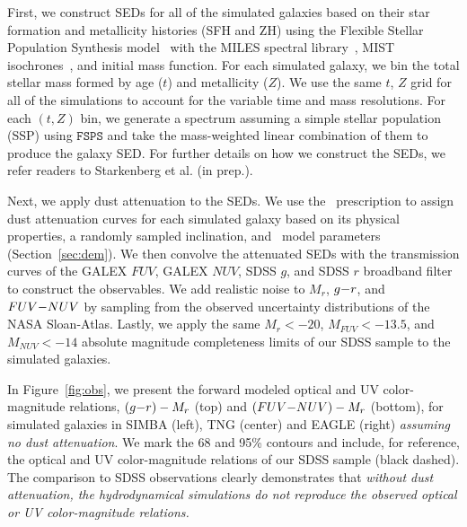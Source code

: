 First, we construct SEDs for all of the simulated galaxies based on their star
formation and metallicity histories (SFH and ZH) using the Flexible Stellar Population Synthesis
model~\citep[$\mathtt{FSPS}$;][]{conroy2009, conroy2010} with the MILES
spectral library~\citep{sanchez_blazquez2006}, MIST
isochrones~\citep{paxton2011, paxton2013, paxton2015, choi2016, dotter2016},
and \cite{chabrier2003} initial mass function.
For each simulated galaxy, we bin the total stellar mass formed by age ($t$) and metallicity
($Z$). We use the same $t$, $Z$ grid for all of the simulations
to account for the variable time and mass resolutions. 
For each $(t, Z)$ bin, we generate a spectrum assuming a simple stellar
population (SSP) using $\mathtt{FSPS}$ and take the mass-weighted linear
combination of them to produce the galaxy SED. 
For further details on how we construct the SEDs, we refer readers to
Starkenberg et al. (in prep.).

Next, we apply dust attenuation to the SEDs. We use the \eda~prescription
to assign dust attenuation curves for each simulated galaxy based on its physical
properties, a randomly sampled inclination, and \eda~model parameters
(Section~\ref{sec:dem}). 
We then convolve the attenuated SEDs with the transmission curves of the GALEX
$FUV$, GALEX $NUV$, SDSS $g$, and SDSS $r$ broadband filter to construct the
observables. 
We add realistic noise to $M_r$, $g{-}r$, and $FUV{-}NUV$ by sampling from the
observed uncertainty distributions of the NASA Sloan-Atlas.
Lastly, we apply the same $M_r < -20$, $M_{FUV} < -13.5$, and $M_{NUV} < -14$
absolute magnitude completeness limits of our SDSS sample to the simulated 
galaxies. 

In Figure~\ref{fig:obs}, we present the forward modeled optical and UV
color-magnitude relations, $(g{-}r)-M_r$ (top) and $(FUV{-}NUV)-M_r$ (bottom),
for simulated galaxies in SIMBA (left), TNG (center) and EAGLE (right)
\emph{assuming no dust attenuation}. We mark the 68 and 95\% contours and
include, for reference, the optical and UV color-magnitude relations of our
SDSS sample (black dashed). 
The comparison to SDSS observations clearly demonstrates
that {\em without dust attenuation, the hydrodynamical simulations do not
reproduce the observed optical or UV color-magnitude relations.}

